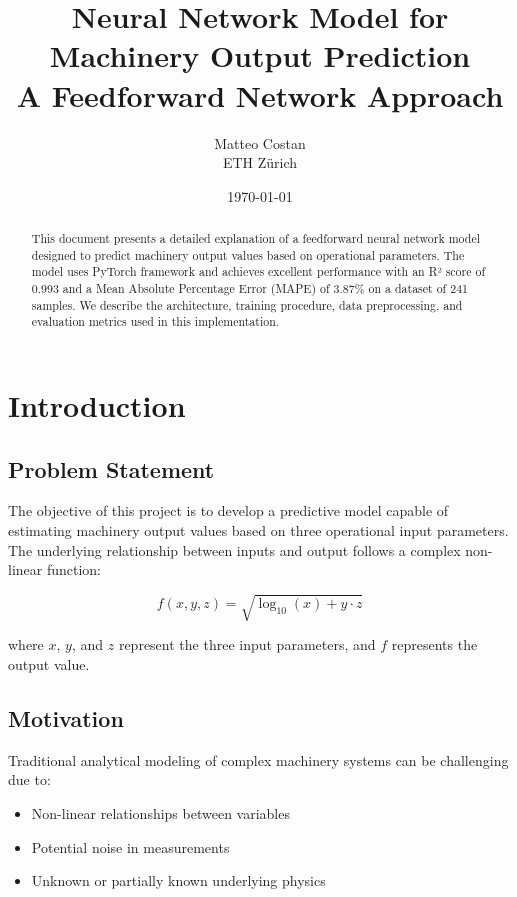 \documentclass[12pt,a4paper]{article}
\title{\textbf{Neural Network Model for Machinery Output Prediction}\\
\large A Feedforward Network Approach}
\author{Matteo Costan\\
ETH Zürich}
\date{\today}
\begin{document}
\maketitle

\begin{abstract}
This document presents a detailed explanation of a feedforward neural network model designed to predict machinery output values based on operational parameters. The model uses PyTorch framework and achieves excellent performance with an R² score of 0.993 and a Mean Absolute Percentage Error (MAPE) of 3.87\% on a dataset of 241 samples. We describe the architecture, training procedure, data preprocessing, and evaluation metrics used in this implementation.
\end{abstract}

\tableofcontents
\newpage

\section{Introduction}

\subsection{Problem Statement}

The objective of this project is to develop a predictive model capable of estimating machinery output values based on three operational input parameters. The underlying relationship between inputs and output follows a complex non-linear function:

\begin{equation}
    f(x, y, z) = \sqrt{\log_{10}(x) + y \cdot z}
\end{equation}

where $x$, $y$, and $z$ represent the three input parameters, and $f$ represents the output value.

\subsection{Motivation}

Traditional analytical modeling of complex machinery systems can be challenging due to:
\begin{itemize}
    \item Non-linear relationships between variables
    \item Potential noise in measurements
    \item Unknown or partially known underlying physics
\end{itemize}
\end{document}
